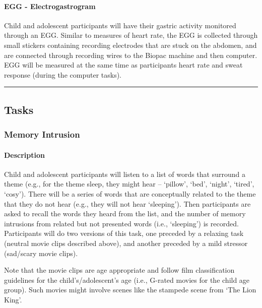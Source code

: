 \documentclass[]{book}
\let\oldparagraph\paragraph
\renewcommand{\paragraph}[1]{\oldparagraph{#1}\mbox{}}
\begin{document}
\hypertarget{egg---electrogastrogram}{%
\paragraph{EGG - Electrogastrogram}\label{egg---electrogastrogram}}

Child and adolescent participants will have their gastric activity monitored through an EGG. Similar to measures of heart rate, the EGG is collected through small stickers containing recording electrodes that are stuck on the abdomen, and are connected through recording wires to the Biopac machine and then computer. EGG will be measured at the same time as participants heart rate and sweat response (during the computer tasks).

\begin{center}\rule{0.5\linewidth}{0.5pt}\end{center}

\hypertarget{tasks}{%
\subsection{Tasks}\label{tasks}}

\hypertarget{memory-intrusion}{%
\subsubsection{Memory Intrusion}\label{memory-intrusion}}

\hypertarget{description-1}{%
\paragraph{Description}\label{description-1}}

Child and adolescent participants will listen to a list of words that surround a theme (e.g., for the theme sleep, they might hear -- `pillow', `bed', `night', `tired', `cosy'). There will be a series of words that are conceptually related to the theme that they do not hear (e.g., they will not hear `sleeping'). Then participants are asked to recall the words they heard from the list, and the number of memory intrusions from related but not presented words (i.e., `sleeping') is recorded. Participants will do two versions of this task, one preceded by a relaxing task (neutral movie clips described above), and another preceded by a mild stressor (sad/scary movie clips).

Note that the movie clips are age appropriate and follow film classification guidelines for the child's/adolescent's age (i.e., G-rated movies for the child age group). Such movies might involve scenes like the stampede scene from `The Lion King'.
\end{document}
